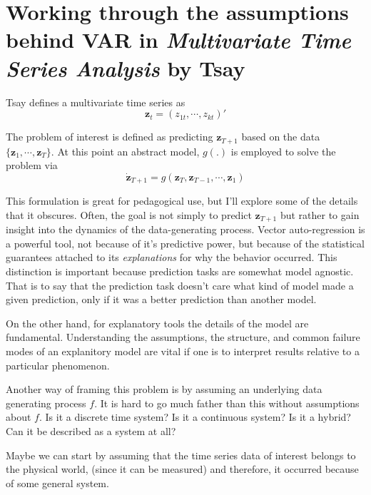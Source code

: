 \documentclass{article}
\begin{document}
    \section{Working through the assumptions behind VAR in \textit{Multivariate
    Time Series Analysis} by Tsay}
   
        Tsay defines a multivariate time series as
        \[
            \bm{z}_t = (z_{1t}, \cdots, z_{kt})'
        \]
    
        The problem of interest is defined as predicting $\bm{z}_{T+1}$ based on
        the data $\{\bm{z}_1, \cdots, \bm{z}_T\}$. At this point an abstract
        model, $g(.)$ is employed to solve the problem via
        \[
            \dot{\bm{z}}_{T+1} = g(\bm{z}_T, \bm{z}_{T-1}, \cdots, \bm{z}_1)
        \]
    
        This formulation is great for pedagogical use, but I'll explore
        some of the details that it obscures. Often, the goal is not
        simply to predict $\bm{z}_{T+1}$ but rather to gain
        insight into the dynamics of the data-generating process. Vector
        auto-regression is a powerful tool, not because of it's
        predictive power, but because of the statistical guarantees
        attached to its \textit{explanations} for why the behavior
        occurred. This distinction is important because prediction
        tasks are somewhat model agnostic. That is to say that
        the prediction task doesn't care what kind of model made
        a given prediction, only if it was a better prediction
        than another model.
   
   
        On the other hand, for explanatory tools the details of the model
        are fundamental. Understanding the assumptions, the structure,
        and common failure modes of an explanitory model are vital if 
        one is to interpret results relative to a particular phenomenon.
    
        Another way of framing this problem is by assuming an underlying
        data generating process $f$. It is hard to go much father than this
        without assumptions about $f$. Is it a discrete time system?
        Is it a continuous system? Is it a hybrid? Can it be described
        as a system at all?
    
        Maybe we can start by assuming that the time series
        data of interest belongs to the physical world,
        (since it can be
        measured) and therefore, it occurred because of some general
        system.
    
\end{document}
